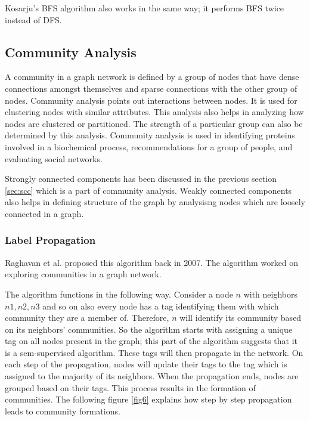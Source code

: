 \documentclass[journal,twoside,web]{ieeecolor}
\begin{document}
Kosarju's BFS algorithm also works in the same way; it performs BFS twice instead of DFS.

\subsection{Community Analysis}
A community in a graph network is defined by a group of nodes that have dense connections amongst themselves and sparse connections with the other group of nodes. Community analysis points out interactions between nodes. It is used for clustering nodes with similar attributes. This analysis also helps in analyzing how nodes are clustered or partitioned. The strength of a particular group can also be determined by this analysis. Community analysis is used in identifying proteins involved in a biochemical process, recommendations for a group of people, and evaluating social networks. 

Strongly connected components has been discussed in the previous section \ref{sec:scc} which is a part of community analysis. Weakly connected components also helps in defining structure of the graph by analysisng nodes which are loosely connected in a graph.

\subsubsection{Label Propagation}
Raghavan et al. proposed this algorithm back in 2007\cite{16}. The algorithm worked on exploring communities in a graph network. 

The algorithm functions in the following way. Consider a node $n$ with neighbors $n1, n2, n3$ and so on also every node has a tag identifying them with which community they are a member of. Therefore, $n$ will identify its community based on its neighbors' communities. So the algorithm starts with assigning a unique tag on all nodes present in the graph; this part of the algorithm suggests that it is a sem-supervised algorithm. These tags will then propagate in the network. On each step of the propagation, nodes will update their tags to the tag which is assigned to the majority of its neighbors. When the propagation ends, nodes are grouped based on their tags. This process results in the formation of communities. The following figure \ref{fig6} explains how step by step propagation leads to community formations.
\end{document}
